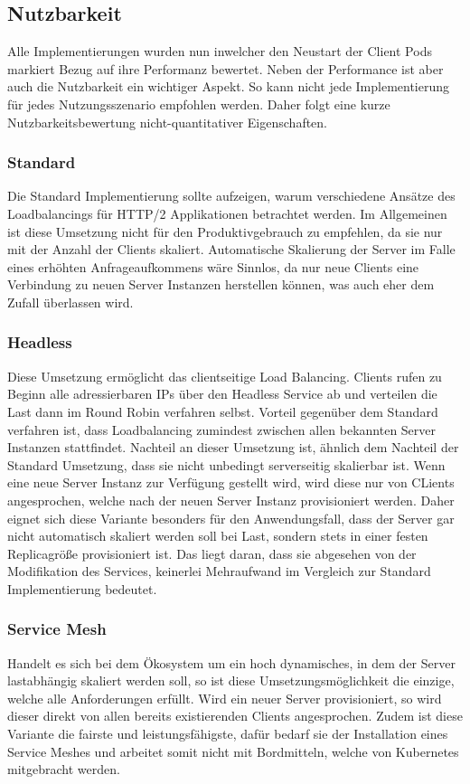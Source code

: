 \subsection{Nutzbarkeit}\label{subsec:nutzbarkeit}

Alle Implementierungen wurden nun inwelcher den Neustart der Client Pods markiert Bezug auf ihre Performanz bewertet.
Neben der Performance ist aber auch die Nutzbarkeit ein wichtiger Aspekt.
So kann nicht jede Implementierung für jedes Nutzungsszenario empfohlen werden.
Daher folgt eine kurze Nutzbarkeitsbewertung nicht-quantitativer Eigenschaften.

\subsubsection{Standard}
Die Standard Implementierung sollte aufzeigen, warum verschiedene Ansätze des Loadbalancings für HTTP/2 Applikationen betrachtet werden.
Im Allgemeinen ist diese Umsetzung nicht für den Produktivgebrauch zu empfehlen, da sie nur mit der Anzahl der Clients skaliert.
Automatische Skalierung der Server im Falle eines erhöhten Anfrageaufkommens wäre Sinnlos, da nur neue Clients eine Verbindung zu neuen Server Instanzen herstellen können, was auch eher dem Zufall überlassen wird.

\subsubsection{Headless}
Diese Umsetzung ermöglicht das clientseitige Load Balancing.
Clients rufen zu Beginn alle adressierbaren IPs über den Headless Service ab und verteilen die Last dann im Round Robin verfahren selbst.
Vorteil gegenüber dem Standard verfahren ist, dass Loadbalancing zumindest zwischen allen bekannten Server Instanzen stattfindet.
Nachteil an dieser Umsetzung ist, ähnlich dem Nachteil der Standard Umsetzung, dass sie nicht unbedingt serverseitig skalierbar ist.
Wenn eine neue Server Instanz zur Verfügung gestellt wird, wird diese nur von CLients angesprochen, welche nach der neuen Server Instanz provisioniert werden.
Daher eignet sich diese Variante besonders für den Anwendungsfall, dass der Server gar nicht automatisch skaliert werden soll bei Last, sondern stets in einer festen Replicagröße provisioniert ist.
Das liegt daran, dass sie abgesehen von der Modifikation des Services, keinerlei Mehraufwand im Vergleich zur Standard Implementierung bedeutet.

\subsubsection{Service Mesh}
Handelt es sich bei dem Ökosystem um ein hoch dynamisches, in dem der Server lastabhängig skaliert werden soll, so ist diese Umsetzungsmöglichkeit die einzige, welche alle Anforderungen erfüllt.
Wird ein neuer Server provisioniert, so wird dieser direkt von allen bereits existierenden Clients angesprochen.
Zudem ist diese Variante die fairste und leistungsfähigste, dafür bedarf sie der Installation eines Service Meshes und arbeitet somit nicht mit Bordmitteln, welche von Kubernetes mitgebracht werden.
